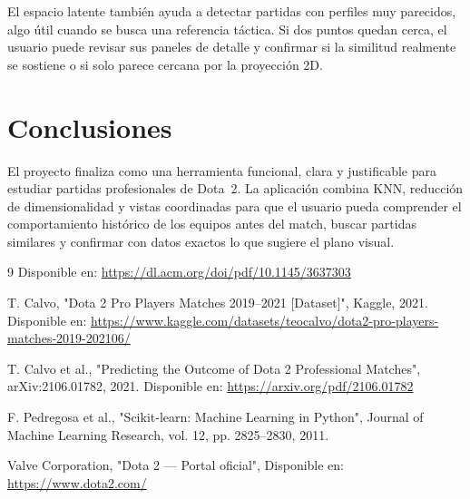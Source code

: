 \documentclass[conference]{IEEEtran}
\begin{document}
El espacio latente también ayuda a detectar partidas con perfiles muy parecidos, algo útil cuando se busca una referencia táctica. Si dos puntos quedan cerca, el usuario puede revisar sus paneles de detalle y confirmar si la similitud realmente se sostiene o si solo parece cercana por la proyección 2D.

\section{Conclusiones}
El proyecto finaliza como una herramienta funcional, clara y justificable para estudiar partidas profesionales de Dota~2. La aplicación combina KNN, reducción de dimensionalidad y vistas coordinadas para que el usuario pueda comprender el comportamiento histórico de los equipos antes del match, buscar partidas similares y confirmar con datos exactos lo que sugiere el plano visual.

\begin{thebibliography}{9}
 Disponible en: \url{https://dl.acm.org/doi/pdf/10.1145/3637303}

 T. Calvo, "Dota 2 Pro Players Matches 2019--2021 [Dataset]", Kaggle, 2021. Disponible en: \url{https://www.kaggle.com/datasets/teocalvo/dota2-pro-players-matches-2019-202106/}

 T. Calvo et al., "Predicting the Outcome of Dota 2 Professional Matches", arXiv:2106.01782, 2021. Disponible en: \url{https://arxiv.org/pdf/2106.01782}

 F. Pedregosa et al., "Scikit-learn: Machine Learning in Python", Journal of Machine Learning Research, vol. 12, pp. 2825--2830, 2011.

 Valve Corporation, "Dota 2 — Portal oficial", Disponible en: \url{https://www.dota2.com/}
\end{thebibliography}
\end{document}
